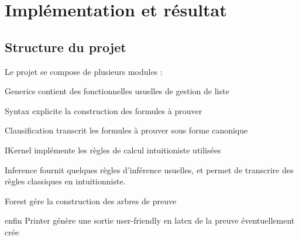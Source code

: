
\section{Impl\'ementation et r\'esultat}

\subsection{Structure du projet}

Le projet se compose de plusieurs modules :

Generics contient des fonctionnelles usuelles de gestion de liste

Syntax explicite la construction des formules \`a prouver

Clausification transcrit les formules \`a prouver sous forme canonique

IKernel impl\'emente les r\`egles de calcul intuitioniste utilis\'ees

Inference fournit quelques r\`egles d'inf\'erence usuelles, et permet de transcrire des r\`egles classiques en intuitionniste.

Forest g\'ere la construction des arbres de preuve

enfin Printer g\'en\`ere une sortie user-friendly en latex de la preuve \'eventuellement cr\'ee

